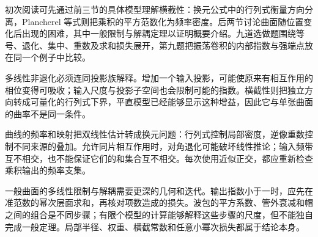 初次阅读可先通过前三节的具体模型理解横截性：换元公式中的行列式衡量方向分离，Plancherel 等式则把乘积的平方范数化为频率密度。后两节讨论曲面随位置变化后出现的困难，其中一般限制与解耦定理以证明概要介绍。九道选做题围绕等号、退化、集中、重数及求和损失展开，第九题把振荡卷积的内部指数与强端点放在同一个例子中比较。







\begin{chaptersummary}
多线性非退化必须连同投影族解释。增加一个输入投影，可能使原来有相互作用的相位变得可吸收；输入尺度与投影子空间也会限制可能的指数。横截性则把独立方向转成可量化的行列式下界，平直模型已经能够显示这种增益，因此它与单张曲面的曲率不是同一条件。

\ProseParagraphBreak

曲线的频率和映射把双线性估计转成换元问题：行列式控制局部密度，逆像重数控制不同来源的叠加。允许同片相互作用时，对角退化可能破坏线性推论；输入频带互不相交，也不能保证它们的和集合互不相交。每次使用近似正交，都应重新检查乘积输出的频率支集。

\ProseParagraphBreak

一般曲面的多线性限制与解耦需要更深的几何和迭代。输出指数小于一时，应先在准范数的幂次层面求和，再核对项数造成的损失。波包的平方系数、管外衰减和帽之间的组合是不同步骤；有限个模型的计算能够解释这些步骤的尺度，但不能独自完成一般定理。局部半径、权重、横截常数和任意小幂次损失都属于结论本身。
\end{chaptersummary}

\BookExercises

